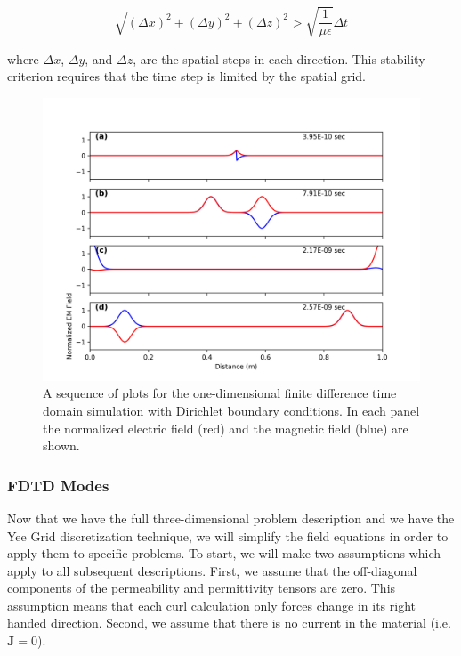 \documentclass[a4paper]{article}
\begin{document}
\begin{equation}
    \sqrt{(\Delta x)^2 + (\Delta y)^2 + (\Delta z)^2} > \sqrt{\frac{1}{\mu \epsilon}} \Delta t
\end{equation}

where $\Delta x$, $\Delta y$, and $\Delta z$, are the spatial steps in each direction. This stability criterion requires that the time step is limited by the spatial grid. 

\begin{figure}
    \centering
    \includegraphics[width=\textwidth]{./Figures/DirichletBC.png}
    \caption{A sequence of plots for the one-dimensional finite difference time domain simulation with Dirichlet boundary conditions. In each panel the normalized electric field (red) and the magnetic field (blue) are shown.}
    \label{fig:Dirichlet}
\end{figure}

\subsubsection{FDTD Modes}

Now that we have the full three-dimensional problem description and we have the Yee Grid discretization technique, we will simplify the field equations in order to apply them to specific problems. To start, we will make two assumptions which apply to all subsequent descriptions. First, we assume that the off-diagonal components of the permeability and permittivity tensors are zero. This assumption means that each curl calculation only forces change in its right handed direction. Second, we assume that there is no current in the material (i.e. $\textbf{J}=0$). 
\end{document}
